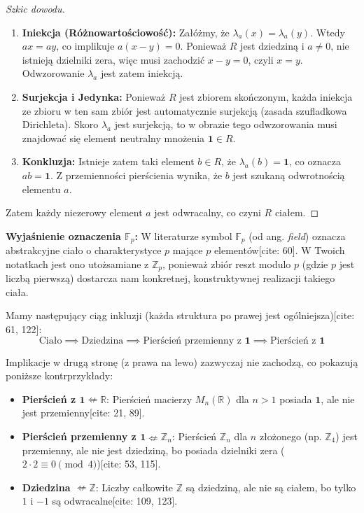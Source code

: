 \begin{enumerate}[label=\arabic*)]
\begin{proof}[Szkic dowodu]
\begin{enumerate}
    \item \textbf{Iniekcja (Różnowartościowość):} Załóżmy, że $\lambda_a(x) = \lambda_a(y)$. Wtedy $ax = ay$, co implikuje $a(x-y) = 0$. 
    Ponieważ $R$ jest dziedziną i $a \neq 0$, nie istnieją dzielniki zera, więc musi zachodzić $x-y = 0$, czyli $x=y$. 
    Odwzorowanie $\lambda_a$ jest zatem iniekcją.
    
    \item \textbf{Surjekcja i Jedynka:} Ponieważ $R$ jest zbiorem skończonym, każda iniekcja ze zbioru w ten sam zbiór jest automatycznie surjekcją (zasada szufladkowa Dirichleta). 
    Skoro $\lambda_a$ jest surjekcją, to w obrazie tego odwzorowania musi znajdować się element neutralny mnożenia $\mathbf{1} \in R$.
    
    \item \textbf{Konkluzja:} Istnieje zatem taki element $b \in R$, że $\lambda_a(b) = \mathbf{1}$, co oznacza $ab = \mathbf{1}$. 
    Z przemienności pierścienia wynika, że $b$ jest szukaną odwrotnością elementu $a$.
\end{enumerate}
Zatem każdy niezerowy element $a$ jest odwracalny, co czyni $R$ ciałem.
\end{proof}
	
\end{enumerate}

\noindent \textbf{Wyjaśnienie oznaczenia $\mathbb{F}_p$:} 
W literaturze symbol $\mathbb{F}_p$ (od ang. \textit{field}) oznacza abstrakcyjne ciało o charakterystyce $p$ mające $p$ elementów[cite: 60]. W Twoich notatkach jest ono utożsamiane z $\mathbb{Z}_p$, ponieważ zbiór reszt modulo $p$ (gdzie $p$ jest liczbą pierwszą) dostarcza nam konkretnej, konstruktywnej realizacji takiego ciała.



\begin{remark}
Mamy następujący ciąg inkluzji (każda struktura po prawej jest ogólniejsza)[cite: 61, 122]:
\[ \text{Ciało} \implies \text{Dziedzina} \implies \text{Pierścień przemienny z } \mathbf{1} \implies \text{Pierścień z } \mathbf{1} \]

Implikacje w drugą stronę (z prawa na lewo) zazwyczaj nie zachodzą, co pokazują poniższe kontrprzykłady:
\begin{itemize}
    \item \textbf{Pierścień z $\mathbf{1} \nLeftarrow \mathbb{R}$}: Pierścień macierzy $M_n(\mathbb{R})$ dla $n > 1$ posiada $\mathbf{1}$, ale nie jest przemienny[cite: 21, 89].
    \item \textbf{Pierścień przemienny z $\mathbf{1} \nLeftarrow \mathbb{Z}_n$}: Pierścień $\mathbb{Z}_n$ dla $n$ złożonego (np. $\mathbb{Z}_4$) jest przemienny, ale nie jest dziedziną, bo posiada dzielniki zera ($2 \cdot 2 \equiv 0 \pmod 4$)[cite: 53, 115].
    \item \textbf{Dziedzina $\nLeftarrow \mathbb{Z}$}: Liczby całkowite $\mathbb{Z}$ są dziedziną, ale nie są ciałem, bo tylko $1$ i $-1$ są odwracalne[cite: 109, 123].
\end{itemize}
\end{remark}

